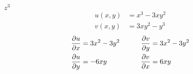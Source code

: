 \item[1.] $z^3$
\begin{align*}
    u(x,y) &= x^3 - 3xy^2\\
    v(x,y) &= 3xy^2 - y^3
\end{align*}
\begin{align*}
    \frac{\partial u}{\partial x}  &= 3x^2 - 3y^2  &\qquad \frac{\partial v}{\partial y}  &= 3x^2 - 3y^2 \\
    \frac{\partial u}{\partial y} &= -6xy           &\qquad \frac{\partial v}{\partial x} &= 6xy
\end{align*}

